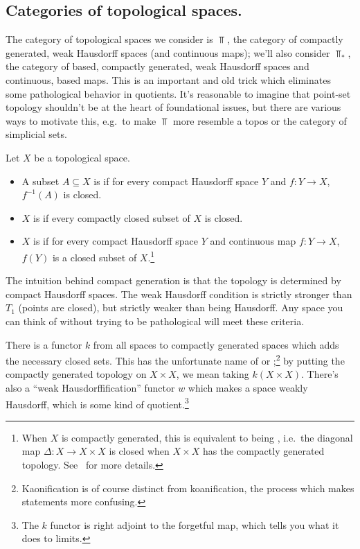 \subsection*{Categories of topological spaces.}
The category of topological spaces we consider is $\Top$, the category of compactly generated, weak Hausdorff
spaces (and continuous maps); we'll also consider $\Top_*$, the category of based, compactly generated, weak
Hausdorff spaces and continuous, based maps. This is an important and old trick which eliminates some pathological
behavior in quotients. It's reasonable to imagine that point-set topology shouldn't be at the heart of foundational
issues, but there are various ways to motivate this, e.g.\ to make $\Top$ more resemble a topos or the category of
simplicial sets.
\begin{defn}
Let $X$ be a topological space.
\begin{itemize}
	\item A subset $A\subseteq X$ is  if for every compact Hausdorff space $Y$ and $f\colon
	Y\to X$, $f^{-1}(A)$ is closed.
	\item $X$ is  if every compactly closed
	subset of $X$ is closed.
	\item $X$ is  if for every compact Hausdorff space $Y$ and continuous map $f\colon Y\to
	X$, $f(Y)$ is a closed subset of $X$.\footnote{When $X$ is compactly generated, this is equivalent to being
	, i.e.\ the diagonal map $\Delta\colon X\to X\times X$ is closed
	when $X\times X$ has the compactly generated topology. See~\cite{StricklandCGWH, RezkCGWH} for more details.}
\end{itemize}
\end{defn}
The intuition behind compact generation is that the topology is determined by compact Hausdorff spaces. The weak
Hausdorff condition is strictly stronger than $T_1$ (points are closed), but strictly weaker than being Hausdorff.
Any space you can think of without trying to be pathological will meet these criteria.

There is a functor $k$ from all spaces to compactly generated spaces which adds the necessary closed sets. This has
the unfortunate name of  or
;\footnote{Kaonification is of course distinct from koanification, the
process which makes statements more confusing.} by putting the compactly generated topology on $X\times
X$, we mean taking $k(X\times X)$. There's also a ``weak Hausdorffification'' functor $w$ which makes a space weakly Hausdorff, which is some kind of quotient.\footnote{The $k$ functor
is right adjoint to the forgetful map, which tells you what it does to limits.}

